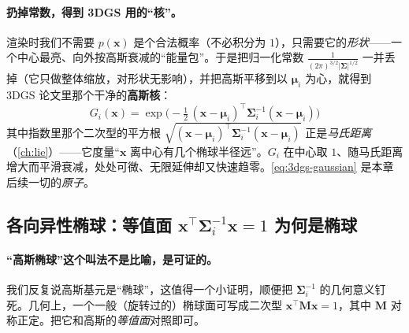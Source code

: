 \paragraph{扔掉常数，得到 3DGS 用的“核”。}
渲染时我们不需要 $p(\mathbf x)$ 是个合法概率（不必积分为 $1$），只需要它的\emph{形状}——一个中心最亮、向外按高斯衰减的“能量包”。于是把归一化常数 $\tfrac{1}{(2\pi)^{3/2}|\boldsymbol\Sigma|^{1/2}}$ 一并丢掉（它只做整体缩放，对形状无影响），并把高斯平移到以 $\boldsymbol\mu_i$ 为心，就得到 3DGS 论文里那个干净的\textbf{高斯核}：
\begin{equation}
  \boxed{\;G_i(\mathbf x)=\exp\!\Big(-\tfrac12\,(\mathbf x-\boldsymbol\mu_i)^\top\boldsymbol\Sigma_i^{-1}(\mathbf x-\boldsymbol\mu_i)\Big)\;}
  \label{eq:3dgs-gaussian}
\end{equation}
其中指数里那个二次型的平方根 $\sqrt{(\mathbf x-\boldsymbol\mu_i)^\top\boldsymbol\Sigma_i^{-1}(\mathbf x-\boldsymbol\mu_i)}$ 正是\emph{马氏距离}（\cref{ch:lie}）——它度量“$\mathbf x$ 离中心有几个椭球半径远”。$G_i$ 在中心取 $1$、随马氏距离增大而平滑衰减，处处可微、无限延伸却又快速趋零。\cref{eq:3dgs-gaussian} 是本章后续一切的\emph{原子}。

\subsection{各向异性椭球：等值面 $\mathbf x^\top\boldsymbol\Sigma_i^{-1}\mathbf x=1$ 为何是椭球}

\paragraph{“高斯椭球”这个叫法不是比喻，是可证的。}
我们反复说高斯基元是“椭球”，这值得一个小证明，顺便把 $\boldsymbol\Sigma_i^{-1}$ 的几何意义钉死。几何上，一个一般（旋转过的）椭球面可写成二次型 $\mathbf x^\top\mathbf M\mathbf x=1$，其中 $\mathbf M$ 对称正定。把它和高斯的\emph{等值面}对照即可。


